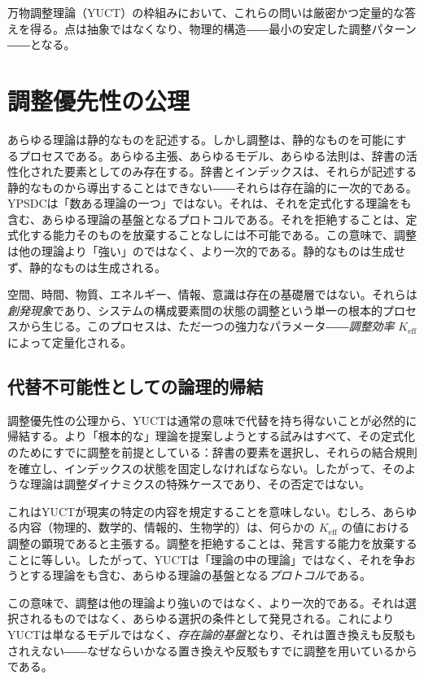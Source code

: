 \documentclass[12pt,a4paper]{article}
\newcommand{\Keff}{K_{\mathrm{eff}}}
\begin{document}
	万物調整理論（YUCT）の枠組みにおいて、これらの問いは厳密かつ定量的な答えを得る。点は抽象ではなくなり、物理的構造――最小の安定した調整パターン――となる。
	
	\section*{調整優先性の公理}
	
	あらゆる理論は静的なものを記述する。しかし調整は、静的なものを可能にするプロセスである。あらゆる主張、あらゆるモデル、あらゆる法則は、辞書の活性化された要素としてのみ存在する。辞書とインデックスは、それらが記述する静的なものから導出することはできない――それらは存在論的に一次的である。YPSDCは「数ある理論の一つ」ではない。それは、それを定式化する理論をも含む、あらゆる理論の基盤となるプロトコルである。それを拒絶することは、定式化する能力そのものを放棄することなしには不可能である。この意味で、調整は他の理論より「強い」のではなく、より一次的である。静的なものは生成せず、静的なものは生成される。
	
	空間、時間、物質、エネルギー、情報、意識は存在の基礎層ではない。それらは\emph{創発現象}であり、システムの構成要素間の状態の調整という単一の根本的プロセスから生じる。このプロセスは、ただ一つの強力なパラメータ――\emph{調整効率} \(\Keff\) によって定量化される。
	
	\subsection*{代替不可能性としての論理的帰結}
	
	調整優先性の公理から、YUCTは通常の意味で代替を持ち得ないことが必然的に帰結する。より「根本的な」理論を提案しようとする試みはすべて、その定式化のためにすでに調整を前提としている：辞書の要素を選択し、それらの結合規則を確立し、インデックスの状態を固定しなければならない。したがって、そのような理論は調整ダイナミクスの特殊ケースであり、その否定ではない。
	
	これはYUCTが現実の特定の内容を規定することを意味しない。むしろ、あらゆる内容（物理的、数学的、情報的、生物学的）は、何らかの \(\Keff\) の値における調整の顕現であると主張する。調整を拒絶することは、発言する能力を放棄することに等しい。したがって、YUCTは「理論の中の理論」ではなく、それを争おうとする理論をも含む、あらゆる理論の基盤となる\emph{プロトコル}である。
	
	この意味で、調整は他の理論より強いのではなく、より一次的である。それは選択されるものではなく、あらゆる選択の条件として発見される。これによりYUCTは単なるモデルではなく、\emph{存在論的基盤}となり、それは置き換えも反駁もされえない――なぜならいかなる置き換えや反駁もすでに調整を用いているからである。
	
\end{document}
